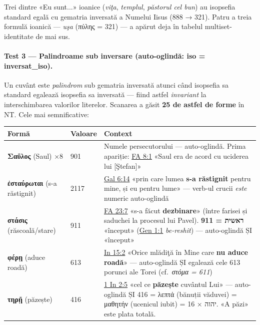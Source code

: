 \documentclass[12pt,a4paper,twoside,openany]{book}
\begin{document}
Trei dintre «Eu sunt...» ioanice (\textit{viţa}, \textit{templul}, \textit{păstorul cel bun}) au isopsefia standard egală cu gematria inversată a Numelui Iisus (888 → 321). Patru a treia formulă ioanică --- \textit{uşa} (πύλης = 321) --- a apărut deja în tabelul multiset-identitate de mai sus.

\paragraph*{Test 3 --- Palindroame sub inversare (auto-oglindă: iso = inversat\_iso).} Un cuvânt este \textit{palindrom} sub gematria inversată atunci când isopsefia sa standard egalează isopsefia sa inversată --- fiind astfel \textit{invariant} la interschimbarea valorilor literelor. Scanarea a găsit \textbf{25 de astfel de forme} în NT. Cele mai semnificative:

\begin{center}
\footnotesize
\begin{tabular}{L{2.8cm}C{1.2cm}L{9.2cm}}
\toprule
{}
\textbf{Formă} & \textbf{Valoare} & \textbf{Context} \\
\midrule
\textbf{Σαῦλος} (Saul) ×8 & 901 & Numele persecutorului --- auto-oglindă. Prima apariție: \href{https://bibliaortodoxa.ro/carte.php?id=51\&cap=8\#1}{FA 8:1} «Saul era de acord cu uciderea lui [Ştefan]» \\
\textbf{ἐσταύρωται} (s-a răstignit) & 2117 & \href{https://bibliaortodoxa.ro/carte.php?id=58\&cap=6\#14}{Gal 6:14} «prin care lumea \textbf{s-a răstignit} pentru mine, și eu pentru lume» --- verb-ul crucii \textit{este} numeric auto-oglindă \\
\textbf{στάσις} (răscoală/stare) & 911 & \href{https://bibliaortodoxa.ro/carte.php?id=51\&cap=23\#7}{FA 23:7} «s-a făcut \textbf{dezbinare}» (între farisei și saduchei la procesul lui Pavel). \textbf{911 = ראשית} «început» (\href{https://bibliaortodoxa.ro/carte.php?id=1\&cap=1\#1}{Gen 1:1} \textit{be-reshit}) --- auto-oglindă ȘI «început» \\
\textbf{φέρῃ} (aduce roadă) & 613 & \href{https://bibliaortodoxa.ro/carte.php?id=35\&cap=15\#2}{In 15:2} «Orice mlădiţă în Mine care \textbf{nu aduce roadă}» --- auto-oglindă ȘI egalează cele 613 porunci ale Torei (cf.~\textit{στόμα = 611}) \\
\textbf{τηρῇ} (păzește) & 416 & \href{https://bibliaortodoxa.ro/carte.php?id=69\&cap=2\#5}{1 In 2:5} «cel ce \textbf{păzește} cuvântul Lui» --- auto-oglindă ȘI 416 = λεπτά (bănuții văduvei) = μαθητήν (ucenicul iubit) = 16 × יהוה. «A păzi» este plata totală. \\
\bottomrule
\end{tabular}
\end{center}
\end{document}
